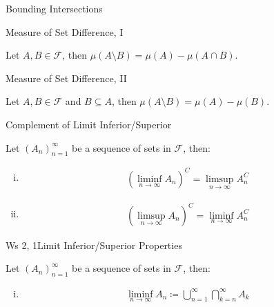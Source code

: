 \documentclass[10pt,landscape]{article}
\newcommand{\CalF}{\mathcal{F}}
\begin{document}
\begin{multicols}{3}
\begin{proposition}{}{Bounding Intersections}
\end{proposition}

\begin{proposition}{}{Measure of Set Difference, I}

    Let $A, B \in \CalF$, then $\mu(A \setminus B) = \mu(A) - \mu(A \cap B)$.

\end{proposition}

\begin{proposition}{}{Measure of Set Difference, II}

    Let $A, B \in \CalF$ and $B \subseteq A$, then $\mu(A \setminus B) = \mu(A) - \mu(B)$.

\end{proposition}

\begin{proposition}{}{Complement of Limit Inferior/Superior}

    Let $(A_n)_{n=1}^{\infty}$ be a sequence of sets in $\CalF$, then:

        \begin{enumerate}[(i)]
            \item
                \begin{align*}
                    \left(\liminf_{n \to \infty} A_n\right)^C = \limsup_{n \to \infty} A_n^C
                \end{align*}
            \item
                \begin{align*}
                    \left(\limsup_{n \to \infty} A_n\right)^C = \liminf_{n \to \infty} A_n^C
                \end{align*}
        \end{enumerate}

\end{proposition}

\begin{exercise}{Ws 2, 1}{Limit Inferior/Superior Properties}

       Let $(A_n)_{n=1}^{\infty}$ be a sequence of sets in $\CalF$, then:

        \begin{enumerate}[(i)]
            \item
                \begin{align*}
                    \liminf_{n \to \infty} A_n \coloneqq \bigcup_{n = 1}^{\infty}\bigcap_{k = n}^{\infty} A_k
                \end{align*}


\end{enumerate}
\end{exercise}
\end{multicols}
\end{document}
